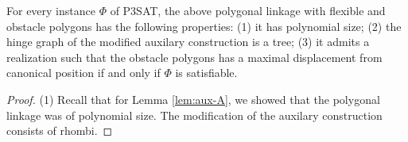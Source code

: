 \begin{lem}\label{lem:aux-B}
For every instance $\Phi$ of P3SAT, the above polygonal linkage with flexible and obstacle polygons has the following properties: (1) it has polynomial size; (2) the hinge graph of the modified auxilary construction is a tree;
(3) it admits a realization such that the obstacle polygons has a maximal displacement from canonical position if and only if $\Phi$ is satisfiable.
\end{lem}

\begin{proof}
\noindent (1) Recall that for Lemma \ref{lem:aux-A}, we showed that the polygonal linkage was of polynomial size.  The modification of the auxilary construction consists of rhombi.




\end{proof}
